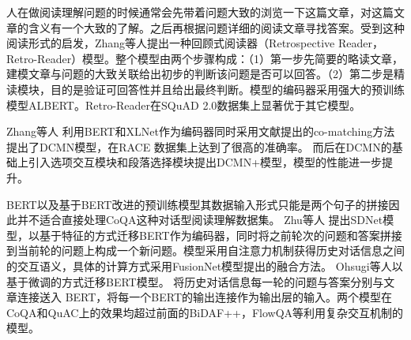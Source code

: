 人在做阅读理解问题的时候通常会先带着问题大致的浏览一下这篇文章，对这篇文章的含义有一个大致的了解。之后再根据问题详细的阅读文章寻找答案。受到这种阅读形式的启发，Zhang等人提出一种回顾式阅读器（Retrospective Reader，Retro-Reader）模型。整个模型由两个步骤构成：（1）第一步先简要的略读文章，建模文章与问题的大致关联给出初步的判断该问题是否可以回答。（2）第二步是精读模块，目的是验证可回答性并且给出最终判断。模型的编码器采用强大的预训练模型ALBERT。Retro-Reader在SQuAD 2.0数据集上显著优于其它模型。

Zhang等人
利用BERT和XLNet作为编码器同时采用文献\cite{Co-matching}提出的co-matching方法提出了DCMN模型，在RACE
数据集上达到了很高的准确率。
而后在DCMN的基础上引入选项交互模块和段落选择模块提出DCMN+\cite{DCMN+}模型，模型的性能进一步提升。

BERT以及基于BERT改进的预训练模型其数据输入形式只能是两个句子的拼接因此并不适合直接处理CoQA这种对话型阅读理解数据集。
Zhu等人
提出SDNet模型，以基于特征的方式迁移BERT作为编码器，同时将之前轮次的问题和答案拼接到当前轮的问题上构成一个新问题。模型采用自注意力机制获得历史对话信息之间的交互语义，具体的计算方式采用FusionNet模型提出的融合方法。
Ohsugi等人以基于微调的方式迁移BERT模型。
将历史对话信息每一轮的问题与答案分别与文章连接送入
BERT，将每一个BERT的输出连接作为输出层的输入。两个模型在CoQA和QuAC上的效果均超过前面的BiDAF++，FlowQA等利用复杂交互机制的模型。

